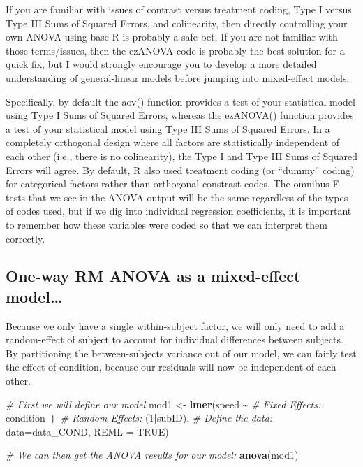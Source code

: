 \documentclass[]{article}
\newenvironment{Shaded}{\begin{snugshade}}{\end{snugshade}}
\newcommand{\CommentTok}[1]{\textcolor[rgb]{0.56,0.35,0.01}{\textit{#1}}}
\newcommand{\DataTypeTok}[1]{\textcolor[rgb]{0.13,0.29,0.53}{#1}}
\newcommand{\DecValTok}[1]{\textcolor[rgb]{0.00,0.00,0.81}{#1}}
\newcommand{\KeywordTok}[1]{\textcolor[rgb]{0.13,0.29,0.53}{\textbf{#1}}}
\newcommand{\NormalTok}[1]{#1}
\newcommand{\OperatorTok}[1]{\textcolor[rgb]{0.81,0.36,0.00}{\textbf{#1}}}
\newcommand{\OtherTok}[1]{\textcolor[rgb]{0.56,0.35,0.01}{#1}}
\newcommand{\StringTok}[1]{\textcolor[rgb]{0.31,0.60,0.02}{#1}}
\begin{document}
If you are familiar with issues of contrast versus treatment coding,
Type I versus Type III Sums of Squared Errors, and colinearity, then
directly controlling your own ANOVA using base R is probably a safe bet.
If you are not familiar with those terms/issues, then the ezANOVA code
is probably the best solution for a quick fix, but I would strongly
encourage you to develop a more detailed understanding of general-linear
models before jumping into mixed-effect models.

Specifically, by default the aov() function provides a test of your
statistical model using Type I Sums of Squared Errors, whereas the
ezANOVA() function provides a test of your statistical model using Type
III Sums of Squared Errors. In a completely orthogonal design where all
factors are statistically independent of each other (i.e., there is no
colinearity), the Type I and Type III Sums of Squared Errors will agree.
By default, R also used treatment coding (or ``dummy'' coding) for
categorical factors rather than orthogonal constrast codes. The omnibus
F-tests that we see in the ANOVA output will be the same regardless of
the types of codes used, but if we dig into individual regression
coefficients, it is important to remember how these variables were coded
so that we can interpret them correctly.

\hypertarget{one-way-rm-anova-as-a-mixed-effect-model}{%
\subsection{One-way RM ANOVA as a mixed-effect
model\ldots{}}\label{one-way-rm-anova-as-a-mixed-effect-model}}

Because we only have a single within-subject factor, we will only need
to add a random-effect of subject to account for individual differences
between subjects. By partitioning the between-subjects variance out of
our model, we can fairly test the effect of condition, because our
residuals will now be independent of each other.

\begin{Shaded}
\begin{Highlighting}[]
\CommentTok{\# First we will define our model}
\NormalTok{mod1 <{-}}\StringTok{ }\KeywordTok{lmer}\NormalTok{(speed }\OperatorTok{\textasciitilde{}}\StringTok{ }
\StringTok{               }\CommentTok{\# Fixed Effects:}
\StringTok{               }\NormalTok{condition }\OperatorTok{+}\StringTok{ }
\StringTok{               }\CommentTok{\# Random Effects: }
\StringTok{               }\NormalTok{(}\DecValTok{1}\OperatorTok{|}\NormalTok{subID), }
             \CommentTok{\# Define the data: }
             \DataTypeTok{data=}\NormalTok{data\_COND, }\DataTypeTok{REML =} \OtherTok{TRUE}\NormalTok{)}

\CommentTok{\# We can then get the ANOVA results for our model:}
\KeywordTok{anova}\NormalTok{(mod1)}
\end{Highlighting}
\end{Shaded}
\end{document}
